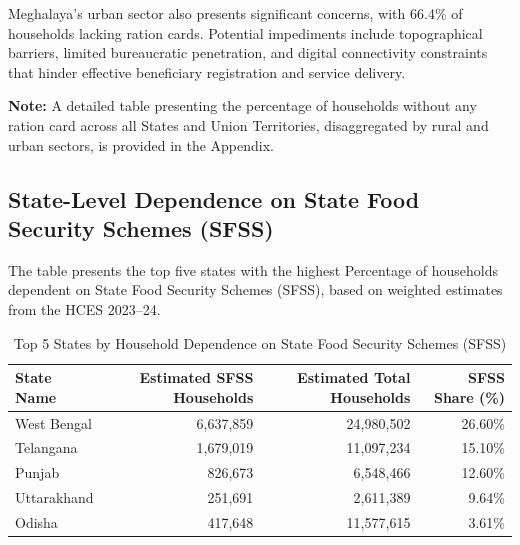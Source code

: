 \documentclass{article}
\begin{document}
Meghalaya’s urban sector also presents significant concerns, with 66.4\% of households lacking ration cards. Potential impediments include topographical barriers, limited bureaucratic penetration, and digital connectivity constraints that hinder effective beneficiary registration and service delivery.

\noindent \textbf{Note:} A detailed table presenting the percentage of households without any ration card across all States and Union Territories, disaggregated by rural and urban sectors, is provided in the Appendix.


\subsection{State-Level Dependence on State Food Security Schemes (SFSS)}

The table presents the top five states with the highest Percentage of households dependent on State Food Security Schemes (SFSS), based on weighted estimates from the HCES 2023–24.

\begin{table}[h]
	\centering
	\caption{Top 5 States by Household Dependence on State Food Security Schemes (SFSS)}
	\begin{tabular}{lrrr}
		\toprule
		\textbf{State Name} & \textbf{Estimated SFSS Households} & \textbf{Estimated Total Households} & \textbf{SFSS Share (\%)} \\
		\midrule
		West Bengal   & 6,637,859  & 24,980,502 & 26.60\% \\
		Telangana     & 1,679,019  & 11,097,234 & 15.10\% \\
		Punjab        &   826,673  &  6,548,466 & 12.60\% \\
		Uttarakhand   &   251,691  &  2,611,389 & 9.64\% \\
		Odisha        &   417,648  & 11,577,615 & 3.61\% \\
		\bottomrule
	\end{tabular}
\end{table}
\end{document}
